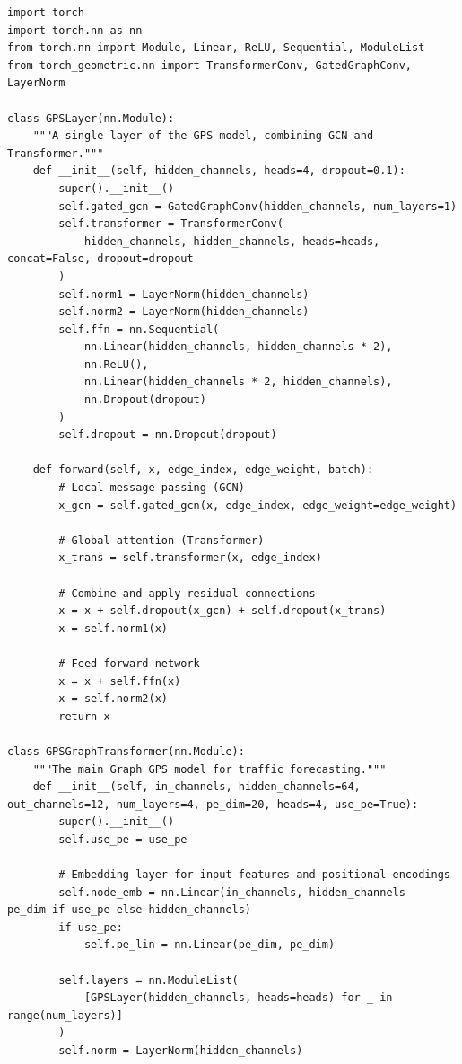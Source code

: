 \documentclass[runningheads]{llncs}
\begin{document}
\begin{lstlisting}[style=customPython]
import torch
import torch.nn as nn
from torch.nn import Module, Linear, ReLU, Sequential, ModuleList
from torch_geometric.nn import TransformerConv, GatedGraphConv, LayerNorm

class GPSLayer(nn.Module):
    """A single layer of the GPS model, combining GCN and Transformer."""
    def __init__(self, hidden_channels, heads=4, dropout=0.1):
        super().__init__()
        self.gated_gcn = GatedGraphConv(hidden_channels, num_layers=1)
        self.transformer = TransformerConv(
            hidden_channels, hidden_channels, heads=heads, concat=False, dropout=dropout
        )
        self.norm1 = LayerNorm(hidden_channels)
        self.norm2 = LayerNorm(hidden_channels)
        self.ffn = nn.Sequential(
            nn.Linear(hidden_channels, hidden_channels * 2),
            nn.ReLU(),
            nn.Linear(hidden_channels * 2, hidden_channels),
            nn.Dropout(dropout)
        )
        self.dropout = nn.Dropout(dropout)
        
    def forward(self, x, edge_index, edge_weight, batch):
        # Local message passing (GCN)
        x_gcn = self.gated_gcn(x, edge_index, edge_weight=edge_weight)
        
        # Global attention (Transformer)
        x_trans = self.transformer(x, edge_index)
        
        # Combine and apply residual connections
        x = x + self.dropout(x_gcn) + self.dropout(x_trans)
        x = self.norm1(x)
        
        # Feed-forward network
        x = x + self.ffn(x)
        x = self.norm2(x)
        return x

class GPSGraphTransformer(nn.Module):
    """The main Graph GPS model for traffic forecasting."""
    def __init__(self, in_channels, hidden_channels=64, out_channels=12, num_layers=4, pe_dim=20, heads=4, use_pe=True):
        super().__init__()
        self.use_pe = use_pe
        
        # Embedding layer for input features and positional encodings
        self.node_emb = nn.Linear(in_channels, hidden_channels - pe_dim if use_pe else hidden_channels)
        if use_pe:
            self.pe_lin = nn.Linear(pe_dim, pe_dim)
        
        self.layers = nn.ModuleList(
            [GPSLayer(hidden_channels, heads=heads) for _ in range(num_layers)]
        )
        self.norm = LayerNorm(hidden_channels)
        

\end{lstlisting}
\end{document}
